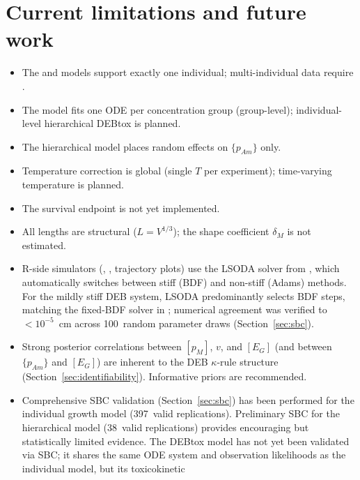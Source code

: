 \documentclass[article,shortnames]{jss}
\newcommand{\pAm}{\{p_{Am}\}}
\newcommand{\pM}{[p_M]}
\newcommand{\EG}{[E_G]}
\begin{document}
\section{Current limitations and future work} \label{sec:limitations}

\begin{itemize}
  \item The  and  models
    support exactly one individual; multi-individual data require
    .
  \item The  model fits one ODE per concentration group
    (group-level); individual-level hierarchical DEBtox is planned.
  \item The hierarchical model places random effects on $\pAm$ only.
  \item Temperature correction is global (single $T$ per experiment);
    time-varying temperature is planned.
  \item The survival endpoint is not yet implemented.
  \item All lengths are structural ($L = V^{1/3}$); the shape
    coefficient $\delta_M$ is not estimated.
  \item R-side simulators (,
    , trajectory plots) use the LSODA
    solver from , which automatically switches between
    stiff (BDF) and non-stiff (Adams) methods.  For the mildly stiff
    DEB system, LSODA predominantly selects BDF steps, matching the
    fixed-BDF solver in ; numerical agreement was
    verified to $< 10^{-5}$~cm across 100~random parameter draws
    (Section~\ref{sec:sbc}).
  \item Strong posterior correlations between $\pM$, $v$, and $\EG$
    (and between $\pAm$ and $\EG$) are inherent to the DEB
    $\kappa$-rule structure (Section~\ref{sec:identifiability}).
    Informative priors are recommended.
  \item Comprehensive SBC validation (Section~\ref{sec:sbc}) has
    been performed for the individual growth model (397~valid
    replications).  Preliminary SBC for the hierarchical model
    (38~valid replications) provides encouraging but statistically
    limited evidence.  The DEBtox model has not yet been validated
    via SBC; it shares the same ODE system and observation
    likelihoods as the individual model, but its toxicokinetic

\end{itemize}
\end{document}
